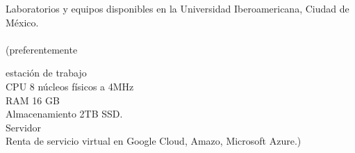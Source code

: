 Laboratorios y equipos disponibles en la Universidad Iberoamericana, Ciudad de México.\\\\
(preferentemente

estación de trabajo\\
CPU 8 núcleos físicos a 4MHz\\
RAM 16 GB\\
Almacenamiento 2TB SSD.\\

Servidor\\
Renta de servicio virtual en Google Cloud, Amazo, Microsoft Azure.)
